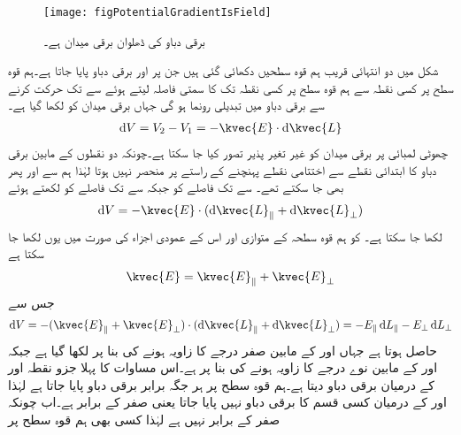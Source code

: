 \begin{figure}
\centering
\texttt{[image: figPotentialGradientIsField]}
\caption{برقی دباو کی ڈھلوان برقی میدان ہے۔}
\label{شکل_توانائی_دباو_ڈھلوان_میدان_ہے}
\end{figure}

شکل  میں دو انتہائی قریب  ہم قوہ  سطحیں دکھائی گئی ہیں جن پر  اور  برقی دباو پایا جاتا ہے۔ہم قوہ سطح  پر کسی نقطہ   سے ہم قوہ سطح  پر کسی نقطہ  تک  کا سمتی فاصلہ  لیتے ہوئے  سے   تک حرکت کرنے سے برقی دباو میں   تبدیلی رونما ہو گی جہاں برقی میدان کو  لکھا گیا ہے۔
\begin{align}\label{مساوات_توانائی_ہم_قوہ_سطح_اور_میدان}
\dif V=V_2-V_1=-\kvec{E} \cdot \dif \kvec{L}
\end{align}
چھوٹی لمبائی  پر برقی میدان کو غیر تغیر پذیر تصور کیا جا سکتا ہے۔چونکہ  دو نقطوں کے مابین برقی دباو کا ابتدائی نقطے سے اختتامی نقطے پہنچنے کے راستے پر منحصر نہیں ہوتا لہٰذا ہم  سے  اور پھر  بھی جا سکتے تھے۔ سے  تک فاصلے کو   جبکہ  سے  تک فاصلے کو   لکھتے ہوئے
\begin{align}
\dif V=-\kvec{E} \cdot (\dif \kvec{L}_\parallel+ \dif \kvec{L}_\perp)
\end{align}
لکھا جا سکتا ہے۔ کو  ہم قوہ سطحہ کے متوازی  اور اس کے عمودی اجزاء کی صورت میں یوں لکھا جا سکتا ہے
\begin{align}
\kvec{E}=\kvec{E}_\parallel+\kvec{E}_\perp
\end{align}  
جس سے
\begin{align}
\dif V=-(\kvec{E}_\parallel+\kvec{E}_\perp) \cdot (\dif \kvec{L}_\parallel+ \dif \kvec{L}_\perp)=-{E}_\parallel \dif L_\parallel-E_\perp \dif L_\perp
\end{align}  
حاصل ہوتا ہے جہاں  اور  کے مابین صفر درجے کا زاویہ ہونے کی بنا پر 
  لکھا گیا ہے جبکہ  اور
  کے مابین نوے درجے کا زاویہ ہونے کی بنا پر  ہے۔اس مساوات کا پہلا جزو  نقطہ  اور  کے درمیان برقی دباو دیتا ہے۔ہم قوہ سطح پر ہر جگہ برابر برقی دباو پایا جاتا ہے لہٰذا  اور  کے درمیان کسی قسم کا برقی دباو نہیں پایا جاتا یعنی  صفر کے برابر ہے۔اب چونکہ  صفر کے برابر نہیں ہے لہٰذا کسی بھی ہم قوہ سطح پر
